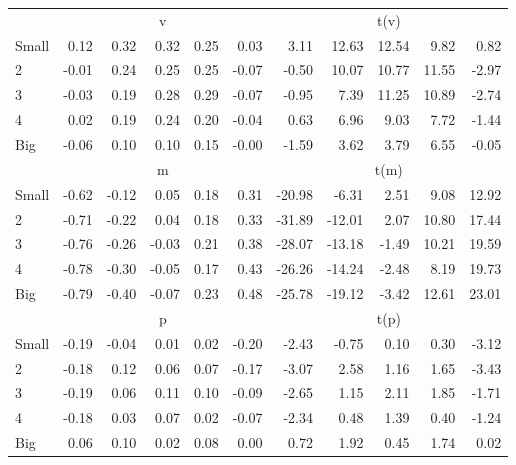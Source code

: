 \begin{table}[H]
\begin{tabular}{lrrrrrrrrrr}
  
     & \multicolumn{5}{c}{v} & \multicolumn{5}{c}{t(v)}   \\
     \cmidrule(r){2-6} \cmidrule(r){7-11} 
    Small  & 0.12  & 0.32  & 0.32  & 0.25  & 0.03  & 3.11  & 12.63  & 12.54  & 9.82  & 0.82   \\
    2  & -0.01  & 0.24  & 0.25  & 0.25  & -0.07  & -0.50  & 10.07  & 10.77  & 11.55  & -2.97   \\
    3  & -0.03  & 0.19  & 0.28  & 0.29  & -0.07  & -0.95  & 7.39  & 11.25  & 10.89  & -2.74   \\
    4  & 0.02  & 0.19  & 0.24  & 0.20  & -0.04  & 0.63  & 6.96  & 9.03  & 7.72  & -1.44   \\
    Big  & -0.06  & 0.10  & 0.10  & 0.15  & -0.00  & -1.59  & 3.62  & 3.79  & 6.55  & -0.05   \\
    
  
     & \multicolumn{5}{c}{m} & \multicolumn{5}{c}{t(m)}   \\
     \cmidrule(r){2-6} \cmidrule(r){7-11} 
    Small  & -0.62  & -0.12  & 0.05  & 0.18  & 0.31  & -20.98  & -6.31  & 2.51  & 9.08  & 12.92   \\
    2  & -0.71  & -0.22  & 0.04  & 0.18  & 0.33  & -31.89  & -12.01  & 2.07  & 10.80  & 17.44   \\
    3  & -0.76  & -0.26  & -0.03  & 0.21  & 0.38  & -28.07  & -13.18  & -1.49  & 10.21  & 19.59   \\
    4  & -0.78  & -0.30  & -0.05  & 0.17  & 0.43  & -26.26  & -14.24  & -2.48  & 8.19  & 19.73   \\
    Big  & -0.79  & -0.40  & -0.07  & 0.23  & 0.48  & -25.78  & -19.12  & -3.42  & 12.61  & 23.01   \\
    
  
     & \multicolumn{5}{c}{p} & \multicolumn{5}{c}{t(p)}   \\
     \cmidrule(r){2-6} \cmidrule(r){7-11} 
    Small  & -0.19  & -0.04  & 0.01  & 0.02  & -0.20  & -2.43  & -0.75  & 0.10  & 0.30  & -3.12   \\
    2  & -0.18  & 0.12  & 0.06  & 0.07  & -0.17  & -3.07  & 2.58  & 1.16  & 1.65  & -3.43   \\
    3  & -0.19  & 0.06  & 0.11  & 0.10  & -0.09  & -2.65  & 1.15  & 2.11  & 1.85  & -1.71   \\
    4  & -0.18  & 0.03  & 0.07  & 0.02  & -0.07  & -2.34  & 0.48  & 1.39  & 0.40  & -1.24   \\
    Big  & 0.06  & 0.10  & 0.02  & 0.08  & 0.00  & 0.72  & 1.92  & 0.45  & 1.74  & 0.02   \\
    
  
  \bottomrule
\end{tabular}
\label{tbl:25_Size_Prior_B16}
\end{table}